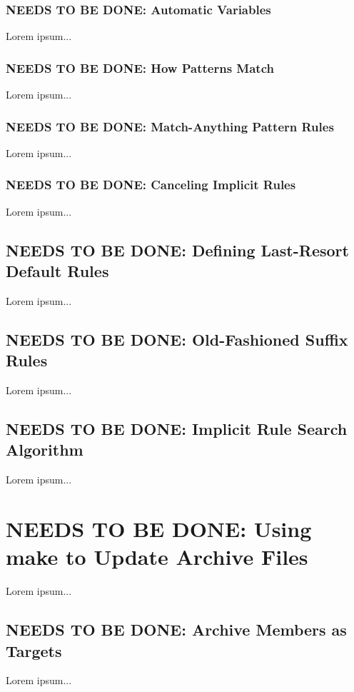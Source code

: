 \documentclass{charun}
\begin{document}
\begin{multicols*}{2}
\color{gray}
\subsubsection{NEEDS TO BE DONE: Automatic Variables}
Lorem ipsum...
\color{black}

\color{gray}
\subsubsection{NEEDS TO BE DONE: How Patterns Match}
Lorem ipsum...
\color{black}

\color{gray}
\subsubsection{NEEDS TO BE DONE: Match-Anything Pattern Rules}
Lorem ipsum...
\color{black}

\color{gray}
\subsubsection{NEEDS TO BE DONE: Canceling Implicit Rules}
Lorem ipsum...
\color{black}

\color{gray}
\subsection{NEEDS TO BE DONE: Defining Last-Resort Default Rules}
Lorem ipsum...
\color{black}

\color{gray}
\subsection{NEEDS TO BE DONE: Old-Fashioned Suffix Rules}
Lorem ipsum...
\color{black}

\color{gray}
\subsection{NEEDS TO BE DONE: Implicit Rule Search Algorithm}
Lorem ipsum...
\color{black}


\color{gray}
\section{NEEDS TO BE DONE: Using make to Update Archive Files}
Lorem ipsum...
\color{black}


\color{gray}
\subsection{NEEDS TO BE DONE: Archive Members as Targets}
Lorem ipsum...
\color{black}


\end{multicols*}
\end{document}
